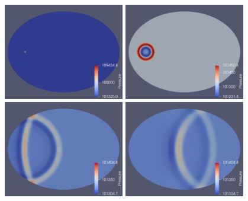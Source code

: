 \clearpage

\begin{figure}[p]
\centering
{} {
	\includegraphics[width=0.47\textwidth]{ellipset0.png}
} \hfill
{} {
	\includegraphics[width=0.47\textwidth]{ellipset001.png}
} \\[2em]
 {
	\includegraphics[width=0.47\textwidth]{ellipset005.png}
} \hfill
{} {
	\includegraphics[width=0.47\textwidth]{ellipset010.png}
}
\end{figure}
